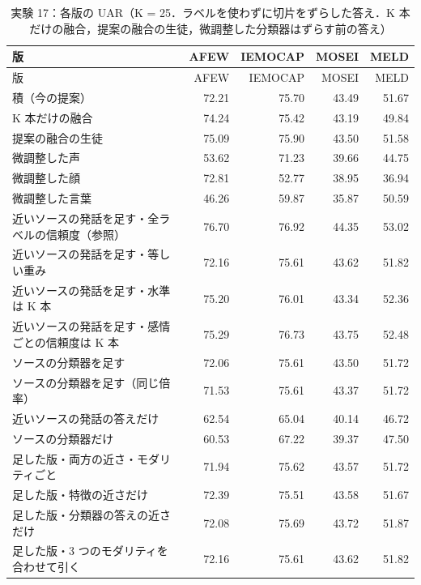 \begin{longtable}{>{\raggedright}p{8.2cm}rrrr}
\caption{実験 17：各版の UAR（K = 25．ラベルを使わずに切片をずらした答え．K 本だけの融合，提案の融合の生徒，微調整した分類器はずらす前の答え）}\\
\toprule
版 & AFEW & IEMOCAP & MOSEI & MELD \\
\midrule
\endfirsthead
\toprule
版 & AFEW & IEMOCAP & MOSEI & MELD \\
\midrule
\endhead
\bottomrule
\endfoot

積（今の提案） & 72.21 & 75.70 & 43.49 & 51.67 \\
K 本だけの融合 & 74.24 & 75.42 & 43.19 & 49.84 \\
提案の融合の生徒 & 75.09 & 75.90 & 43.50 & 51.58 \\
微調整した声 & 53.62 & 71.23 & 39.66 & 44.75 \\
微調整した顔 & 72.81 & 52.77 & 38.95 & 36.94 \\
微調整した言葉 & 46.26 & 59.87 & 35.87 & 50.59 \\
近いソースの発話を足す・全ラベルの信頼度（参照） & 76.70 & 76.92 & 44.35 & 53.02 \\
近いソースの発話を足す・等しい重み & 72.16 & 75.61 & 43.62 & 51.82 \\
近いソースの発話を足す・水準は K 本 & 75.20 & 76.01 & 43.34 & 52.36 \\
近いソースの発話を足す・感情ごとの信頼度は K 本 & 75.29 & 76.73 & 43.75 & 52.48 \\
ソースの分類器を足す & 72.06 & 75.61 & 43.50 & 51.72 \\
ソースの分類器を足す（同じ倍率） & 71.53 & 75.61 & 43.37 & 51.72 \\
近いソースの発話の答えだけ & 62.54 & 65.04 & 40.14 & 46.72 \\
ソースの分類器だけ & 60.53 & 67.22 & 39.37 & 47.50 \\
足した版・両方の近さ・モダリティごと & 71.94 & 75.62 & 43.57 & 51.72 \\
足した版・特徴の近さだけ & 72.39 & 75.51 & 43.58 & 51.67 \\
足した版・分類器の答えの近さだけ & 72.08 & 75.69 & 43.72 & 51.87 \\
足した版・3 つのモダリティを合わせて引く & 72.16 & 75.61 & 43.62 & 51.82 \\
\end{longtable}
